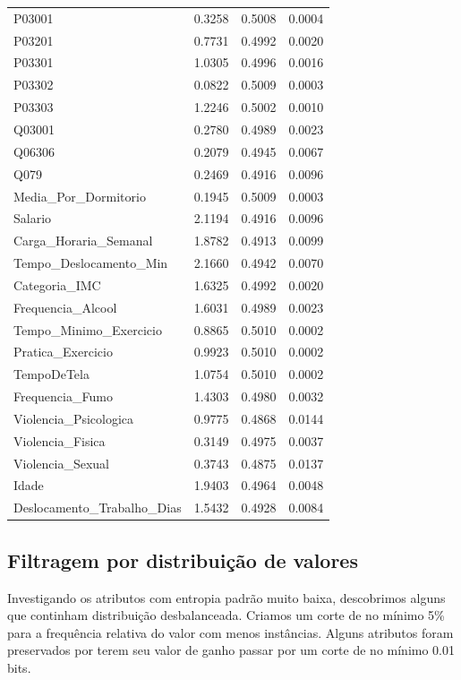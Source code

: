 \documentclass{article}
\begin{document}
\begin{longtable}{|l|c|c|c|}
P03001 & 0.3258 & 0.5008 & 0.0004 \\
P03201 & 0.7731 & 0.4992 & 0.0020 \\
P03301 & 1.0305 & 0.4996 & 0.0016 \\
P03302 & 0.0822 & 0.5009 & 0.0003 \\
P03303 & 1.2246 & 0.5002 & 0.0010 \\
Q03001 & 0.2780 & 0.4989 & 0.0023 \\
Q06306 & 0.2079 & 0.4945 & 0.0067 \\
Q079 & 0.2469 & 0.4916 & 0.0096 \\
Media\_Por\_Dormitorio & 0.1945 & 0.5009 & 0.0003 \\
Salario & 2.1194 & 0.4916 & 0.0096 \\
Carga\_Horaria\_Semanal & 1.8782 & 0.4913 & 0.0099 \\
Tempo\_Deslocamento\_Min & 2.1660 & 0.4942 & 0.0070 \\
Categoria\_IMC & 1.6325 & 0.4992 & 0.0020 \\
Frequencia\_Alcool & 1.6031 & 0.4989 & 0.0023 \\
Tempo\_Minimo\_Exercicio & 0.8865 & 0.5010 & 0.0002 \\
Pratica\_Exercicio & 0.9923 & 0.5010 & 0.0002 \\
TempoDeTela & 1.0754 & 0.5010 & 0.0002 \\
Frequencia\_Fumo & 1.4303 & 0.4980 & 0.0032 \\
Violencia\_Psicologica & 0.9775 & 0.4868 & 0.0144 \\
Violencia\_Fisica & 0.3149 & 0.4975 & 0.0037 \\
Violencia\_Sexual & 0.3743 & 0.4875 & 0.0137 \\
Idade & 1.9403 & 0.4964 & 0.0048 \\
Deslocamento\_Trabalho\_Dias & 1.5432 & 0.4928 & 0.0084 \\
\end{longtable}

\subsection*{Filtragem por distribuição de valores}

Investigando os atributos com entropia padrão muito baixa, descobrimos alguns que continham distribuição desbalanceada. Criamos um corte de no mínimo  5\% para a frequência relativa do valor com menos instâncias. Alguns atributos foram preservados por terem seu valor de ganho passar por um corte de no mínimo 0.01 bits.
\end{document}
